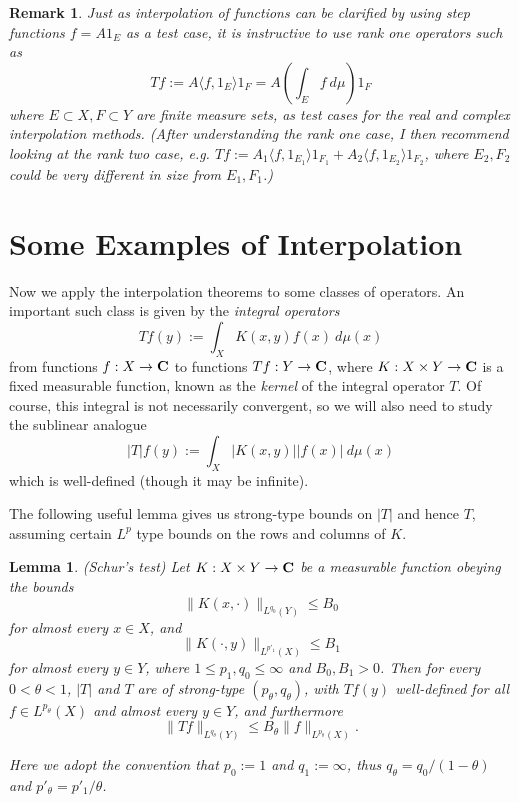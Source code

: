 \documentclass[10pt,reqno]{amsart}
\newtheorem{lemma}[theorem]{Lemma}
\newtheorem{remark}[theorem]{Remark}
\begin{document}
\begin{remark}
    Just as interpolation of functions can be clarified by using step functions $f= A 1_E$ as a test case, it is instructive to use rank one operators such as
\[     Tf := A \langle f, 1_E \rangle 1_F = A (\int_E f\ d\mu) 1_F\]
    where $E \subset X, F \subset Y$ are finite measure sets, as test cases for the real and complex interpolation methods. (After understanding the rank one case, I then recommend looking at the rank two case, e.g. $Tf := A_1 \langle f, 1_{E_1} \rangle 1_{F_1} + A_2 \langle f, 1_{E_2} \rangle 1_{F_2}$, where $E_2, F_2$ could be very different in size from $E_1, F_1$.) 
\end{remark}

\section{Some Examples of Interpolation}

Now we apply the interpolation theorems to some classes of operators. An important such class is given by the \emph{integral operators}
%
\[ Tf(y) := \int_X K(x,y) f(x)\ d\mu(x)\]
%
from functions $f: X \rightarrow {\bf C}$ to functions $Tf: Y \rightarrow {\bf C}$, where $K: X \times Y \rightarrow {\bf C}$ is a fixed measurable function, known as the \emph{kernel} of the integral operator $T$. Of course, this integral is not necessarily convergent, so we will also need to study the sublinear analogue
%
\[ |T| f(y) := \int_X |K(x,y)| |f(x)|\ d\mu(x)\]
%
which is well-defined (though it may be infinite).

The following useful lemma gives us strong-type bounds on $|T|$ and hence $T$, assuming certain $L^p$ type bounds on the rows and columns of $K$.

\begin{lemma}
    (Schur’s test) Let $K: X \times Y \rightarrow {\bf C}$ be a measurable function obeying the bounds
\[     \| K(x, \cdot) \|_{L^{q_0}(Y)} \leq B_0\]
    for almost every $x \in X$, and
\[     \| K(\cdot, y) \|_{L^{p'_1}(X)} \leq B_1\]
    for almost every $y \in Y$, where $1 \leq p_1, q_0 \leq \infty$ and $B_0, B_1 > 0$. Then for every $0 < \theta < 1$, $|T|$ and $T$ are of strong-type $(p_\theta,q_\theta)$, with $Tf(y)$ well-defined for all $f \in L^{p_\theta}(X)$ and almost every $y \in Y$, and furthermore
\[     \| Tf \|_{L^{q_\theta}(Y)} \leq B_\theta \| f\|_{L^{p_\theta}(X)}.\]

    Here we adopt the convention that $p_0 := 1$ and $q_1 := \infty$, thus $q_\theta = q_0/(1-\theta)$ and $p'_\theta = p'_1/\theta$. 
\end{lemma}
\end{document}
